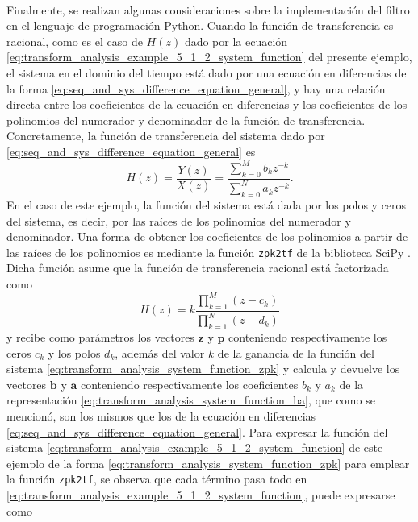 \documentclass[a4paper]{report}
\newcommand{\z}{\mathbf{z}}
\begin{document}
\\
Finalmente, se realizan algunas consideraciones sobre la implementación del filtro en el lenguaje de programación Python. Cuando la función de transferencia es racional, como es el caso de \(H(z)\) dado por la ecuación \ref{eq:transform_analysis_example_5_1_2_system_function} del presente ejemplo, el sistema en el dominio del tiempo está dado por una ecuación en diferencias de la forma \ref{eq:seq_and_sys_difference_equation_general}, y hay una relación directa entre los coeficientes de la ecuación en diferencias y los coeficientes de los polinomios del numerador y denominador de la función de transferencia. Concretamente, la función de transferencia del sistema dado por \ref{eq:seq_and_sys_difference_equation_general} es
\begin{equation}\label{eq:transform_analysis_system_function_ba}
 H(z)=\frac{Y(z)}{X(z)}=\frac{\displaystyle\sum_{k=0}^Mb_kz^{-k}}{\displaystyle\sum_{k=0}^Na_kz^{-k}}. 
\end{equation}
En el caso de este ejemplo, la función del sistema está dada por los polos y ceros del sistema, es decir, por las raíces de los polinomios del numerador y denominador. Una forma de obtener los coeficientes de los polinomios a partir de las raíces de los polinomios es mediante la función \texttt{zpk2tf} de la biblioteca SciPy \cite{2020SciPy-NMeth}. Dicha función asume que la función de transferencia racional está factorizada como
\begin{equation}\label{eq:transform_analysis_system_function_zpk}
 H(z)=k\frac{\displaystyle\prod_{k=1}^M(z-c_k)}{\displaystyle\prod_{k=1}^N(z-d_k)} 
\end{equation}
y recibe como parámetros los vectores \(\z\) y \(\mathbf{p}\) conteniendo respectivamente los ceros \(c_k\) y los polos \(d_k\), además del valor \(k\) de la ganancia de la función del sistema \ref{eq:transform_analysis_system_function_zpk} y calcula y devuelve los vectores \(\mathbf{b}\) y \(\mathbf{a}\) conteniendo respectivamente los coeficientes \(b_k\) y \(a_k\) de la representación \ref{eq:transform_analysis_system_function_ba}, que como se mencionó, son los mismos que los de la ecuación en diferencias \ref{eq:seq_and_sys_difference_equation_general}. Para expresar la función del sistema \ref{eq:transform_analysis_example_5_1_2_system_function} de este ejemplo de la forma \ref{eq:transform_analysis_system_function_zpk} para emplear la función \texttt{zpk2tf}, se observa que cada término pasa todo en \ref{eq:transform_analysis_example_5_1_2_system_function}, puede expresarse como
\end{document}
